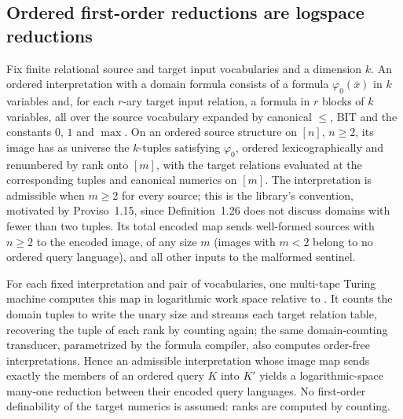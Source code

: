 \begin{result}
\subsection{Ordered first-order reductions are logspace reductions}
Fix finite relational source and target input vocabularies and a dimension
$k$. An ordered interpretation with a domain formula consists of a formula
$\varphi_0(\bar x)$ in $k$ variables and, for each $r$-ary target input
relation, a formula in $r$ blocks of $k$ variables, all over the source
vocabulary expanded by canonical $\le$, BIT and the constants $0$, $1$ and
$\max$. On an ordered source structure on $[n]$, $n\ge2$, its image has as
universe the $k$-tuples satisfying $\varphi_0$, ordered lexicographically and
renumbered by rank onto $[m]$, with the target relations evaluated at the
corresponding tuples and canonical numerics on $[m]$. The interpretation is
admissible when $m\ge2$ for every source; this is the library's convention,
motivated by Proviso~1.15, since Definition~1.26 does not discuss domains with
fewer than two tuples. Its total encoded map sends well-formed sources with $n\ge2$
to the encoded image, of any size $m$ (images with $m<2$ belong to no ordered
query language), and all other inputs to the malformed sentinel.

For each fixed interpretation and pair of vocabularies, one multi-tape Turing
machine computes this map in logarithmic work space relative to
. It counts the domain tuples to write the
unary size and streams each target relation table, recovering the tuple of
each rank by counting again; the same domain-counting transducer, parametrized
by the formula compiler, also computes order-free interpretations. Hence an
admissible interpretation whose image map sends exactly the members of an
ordered query $K$ into $K'$ yields a logarithmic-space many-one reduction
between their encoded query languages. No first-order definability of the
target numerics is assumed: ranks are computed by counting.


\end{result}
